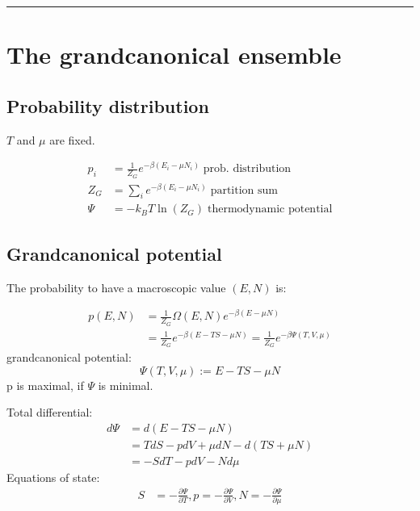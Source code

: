 \noindent\rule[1ex]{\textwidth/5}{1pt}
\section{The grandcanonical ensemble}

\subsection*{Probability distribution}
$T$ and $\mu$ are fixed.

\begin{equation*}
    \begin{aligned}
        p_i &= \frac{1}{Z_G} e^{-\beta (E_i - \mu N_i)} \; \text{prob. distribution} \\
        Z_G &= \sum_i e^{-\beta (E_i - \mu N_i)} \; \text{partition sum} \\
        \Psi &= -k_B T \ln(Z_G) \; \text{thermodynamic potential}
    \end{aligned}
\end{equation*}

\subsection*{Grandcanonical potential}
The probability to have a macroscopic value $(E,N)$ is:

\begin{equation*}
    \begin{aligned}
        p(E,N) &= \frac{1}{Z_G} \Omega(E,N) e^{-\beta(E-\mu N)} \\
            &= \frac{1}{Z_G} e^{-\beta(E-TS-\mu N)} = \frac{1}{Z_G} e^{-\beta \Psi(T,V,\mu)}
    \end{aligned}
\end{equation*}
grandcanonical potential:
\begin{equation*}
    \Psi(T,V,\mu) := E-TS-\mu N
\end{equation*}
p is maximal, if $\Psi$ is minimal. 

Total differential:
\begin{equation*}
    \begin{aligned}
        d\Psi &= d(E-TS-\mu N) \\
            &= TdS - pdV + \mu dN - d(TS + \mu N) \\
            &= -SdT -pdV - Nd\mu
    \end{aligned}
\end{equation*}
Equations of state:
\begin{equation*}
    \begin{aligned}
        S &= - \frac{\partial \Psi}{\partial T} , p = - \frac{\partial \Psi}{\partial V}, N = - \frac{\partial \Psi}{\partial \mu}
    \end{aligned}
\end{equation*}


